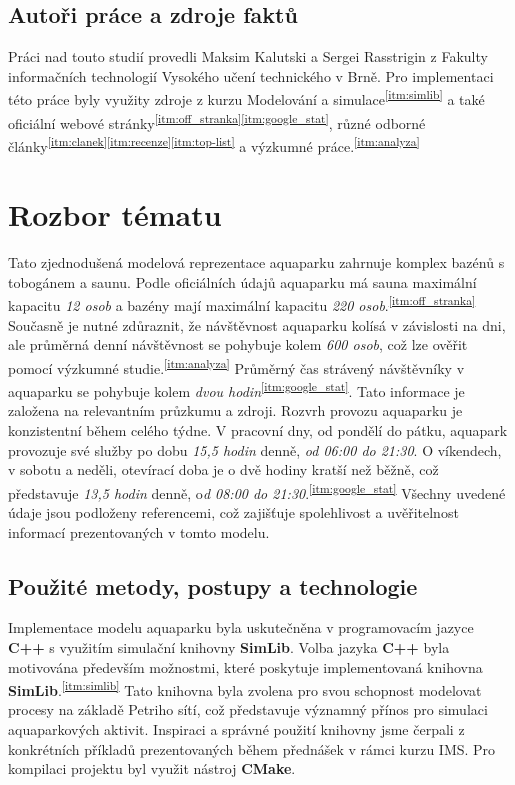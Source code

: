 \documentclass[a4paper, 11pt]{article}
\begin{document}
    \subsection{Autoři práce a zdroje faktů}
    
    Práci nad touto studií provedli Maksim Kalutski a Sergei Rasstrigin z Fakulty informačních technologií Vysokého učení technického v Brně. Pro implementaci této práce byly využity zdroje z kurzu Modelování a simulace\textsuperscript{\ref{itm:simlib}} a také oficiální webové stránky\textsuperscript{\ref{itm:off_stranka}}\textsuperscript{\ref{itm:google_stat}}, různé odborné články\textsuperscript{\ref{itm:clanek}}\textsuperscript{\ref{itm:recenze}}\textsuperscript{\ref{itm:top-list}} a výzkumné práce.\textsuperscript{\ref{itm:analyza}}  
    

    \section{Rozbor tématu}
    Tato zjednodušená modelová reprezentace aquaparku zahrnuje komplex bazénů s tobogánem a saunu. Podle oficiálních údajů aquaparku má sauna maximální kapacitu\textit{ 12 osob} a bazény mají maximální kapacitu \textit{220 osob}.\textsuperscript{\ref{itm:off_stranka}} Současně je nutné zdůraznit, že návštěvnost aquaparku kolísá v závislosti na dni, ale průměrná denní návštěvnost se pohybuje kolem \textit{600 osob}, což lze ověřit pomocí výzkumné studie.\textsuperscript{\ref{itm:analyza}}
    Průměrný čas strávený návštěvníky v aquaparku se pohybuje kolem\textit{ dvou hodin}\textsuperscript{\ref{itm:google_stat}}. Tato informace je založena na relevantním průzkumu a zdroji.
    Rozvrh provozu aquaparku je konzistentní během celého týdne. V pracovní dny, od pondělí do pátku, aquapark provozuje své služby po dobu \textit{15,5 hodin} denně, \textit{od 06:00 do 21:30}. O víkendech, v sobotu a neděli, otevírací doba je o dvě hodiny kratší než běžně, což představuje \textit{13,5 hodin} denně, o\textit{d 08:00 do 21:30}.\textsuperscript{\ref{itm:google_stat}} Všechny uvedené údaje jsou podloženy referencemi, což zajišťuje spolehlivost a uvěřitelnost informací prezentovaných v tomto modelu.

    \subsection{Použité metody, postupy a technologie}
    Implementace modelu aquaparku byla uskutečněna v programovacím jazyce \textbf{C++} s využitím simulační knihovny \textbf{SimLib}. Volba jazyka \textbf{C++} byla motivována především možnostmi, které poskytuje implementovaná knihovna \textbf{SimLib}.\textsuperscript{\ref{itm:simlib}} Tato knihovna byla zvolena pro svou schopnost modelovat procesy na základě Petriho sítí, což představuje významný přínos pro simulaci aquaparkových aktivit. Inspiraci a správné použití knihovny jsme čerpali z konkrétních příkladů prezentovaných během přednášek v rámci kurzu IMS. Pro kompilaci projektu byl využit nástroj \textbf{CMake}.
\end{document}
